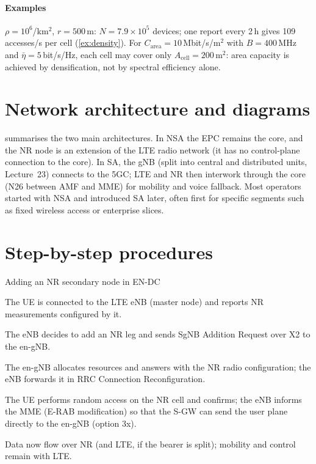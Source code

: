 \documentclass[11pt,a4paper]{article}
\begin{document}
\paragraph{Examples} $\rho = 10^6$/km$^2$, $r = 500$\,m: $N = 7.9\times10^5$ devices; one report every 2\,h gives 109
accesses/s per cell (\cref{ex:density}). For $C_{\mathrm{area}} = 10$\,Mbit/s/m$^2$ with $B = 400$\,MHz and $\bar\eta =
5$\,bit/s/Hz, each cell may cover only $A_{\mathrm{cell}} = 200$\,m$^2$: area capacity is achieved by densification,
not by spectral efficiency alone.

\section{Network architecture and diagrams}
 summarises the two main architectures. In NSA the EPC remains the core, and the NR node is an
extension of the LTE radio network (it has no control-plane connection to the core). In SA, the gNB (split into
central and distributed units, Lecture~23) connects to the 5GC; LTE and NR then interwork through the core
(N26 between AMF and MME) for mobility and voice fallback. Most operators started with NSA and introduced SA
later, often first for specific segments such as fixed wireless access or enterprise slices.

\section{Step-by-step procedures}

\begin{procedurebox}{Adding an NR secondary node in EN-DC}\label{proc:endc}
\begin{steps}
  \item The UE is connected to the LTE eNB (master node) and reports NR measurements configured by it.
  \item The eNB decides to add an NR leg and sends SgNB Addition Request over X2 to the en-gNB.
  \item The en-gNB allocates resources and answers with the NR radio configuration; the eNB forwards it in
        RRC Connection Reconfiguration.
  \item The UE performs random access on the NR cell and confirms; the eNB informs the MME (E-RAB modification)
        so that the S-GW can send the user plane directly to the en-gNB (option 3x).
  \item Data now flow over NR (and LTE, if the bearer is split); mobility and control remain with LTE.
\end{steps}
\end{procedurebox}
\end{document}
